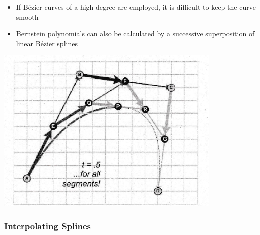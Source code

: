 \documentclass[12pt]{article}
\begin{document}
\begin{itemize}
	\begin{itemize}
		\item If B\'ezier curves of a high degree are employed, it is difficult to keep the curve smooth
		\item Bernstein polynomials can also be calculated by a successive superposition of linear B\'ezier splines
	\end{itemize}
	\includegraphics[scale=0.8]{3_32}
\end{itemize}

\subsubsection*{Interpolating Splines}
\end{document}
